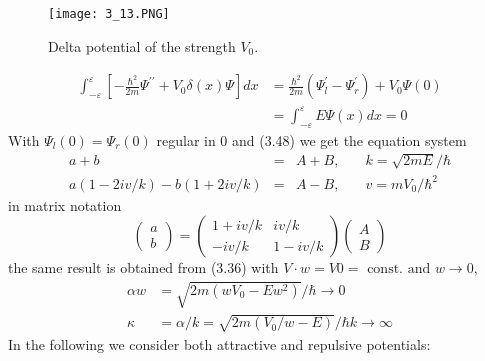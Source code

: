 \begin{figure}[ht]
    \begin{minipage}{0.5\textwidth}
        \centering
        \texttt{[image: 3\_13.PNG]}
    \end{minipage}
    \begin{minipage}{0.5\textwidth}
        \caption{Delta potential of the strength
        $V_0$.}
    \end{minipage}
\end{figure}
\begin{equation}
\begin{aligned} \int_{-\varepsilon}^{\varepsilon}\left[-\frac{\hbar^{2}}{2 m} \Psi^{\prime \prime}+V_{0} \delta(x) \Psi\right] d x &=\frac{\hbar^{2}}{2 m}\left(\Psi_{l}^{\prime}-\Psi_{r}^{\prime}\right)+V_{0} \Psi(0) \\ &=\int_{-\varepsilon}^{\varepsilon} E \Psi(x) d x=0 \end{aligned}
\end{equation}
With $\Psi_l (0) = \Psi_r(0)$ regular in 0 and (3.48) we get the equation system
\begin{equation}
\begin{aligned} a+b &=& A+B, & \quad k=\sqrt{2 m E} / \hbar \\ a(1-2 i v / k)-b(1+2 i v / k) &=&A-B, &\quad v=m V_{0} / \hbar^{2} \end{aligned}
\end{equation}
in matrix notation
\begin{equation}
\left(\begin{array}{l}{a} \\ {b}\end{array}\right)=\left(\begin{array}{cc}{1+i v / k} & {i v / k} \\ {-i v / k} & {1-i v / k}\end{array}\right)\left(\begin{array}{c}{A} \\ {B}\end{array}\right)
\end{equation}
the same result is obtained from (3.36) with $V · w = V0 = \text{ const. and }w \to 0,$
\begin{equation}
\begin{aligned} \alpha w &=\sqrt{2 m\left(w V_{0}-E w^{2}\right)} / \hbar \rightarrow 0 \\ \kappa &=\alpha / k=\sqrt{2 m\left(V_{0} / w-E\right)} / \hbar k \rightarrow \infty \end{aligned}
\end{equation}
In the following we consider both attractive and repulsive potentials:

